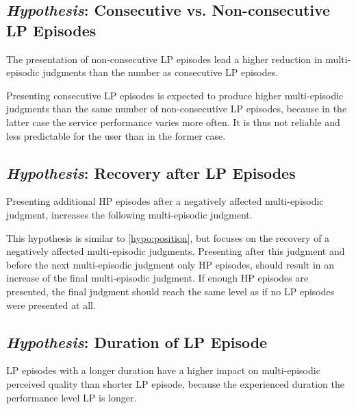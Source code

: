 \subsection{\emph{Hypothesis}: Consecutive vs. Non-consecutive \acs{LP} Episodes}
\begin{hypothesis}\label{hypo:consecutive}
The presentation of non-consecutive \ac{LP} episodes lead a higher reduction in multi-episodic judgments than the number as consecutive \ac{LP} episodes.
\end{hypothesis}

Presenting consecutive \ac{LP} episodes is expected to produce higher multi-episodic judgments than the same number of non-consecutive \ac{LP} episodes, because in the latter case the service performance varies more often.
It is thus not reliable and less predictable for the user than in the former case.

\subsection{\emph{Hypothesis}: Recovery after \acs{LP} Episodes}
\begin{hypothesis}\label{hypo:recovery}
Presenting additional \ac{HP} episodes after a negatively affected multi-episodic judgment, increases the following multi-episodic judgment.
\end{hypothesis}

This hypothesis is similar to \autoref{hypo:position}, but focuses on the recovery of a negatively affected multi-episodic judgments.
Presenting after this judgment and before the next multi-episodic judgment only \ac{HP} episodes, should result in an increase of the final multi-episodic judgment.
If enough \ac{HP} episodes are presented, the final judgment should reach the same level as if no \ac{LP} episodes were presented at all.

\subsection{\emph{Hypothesis}: Duration of \acs{LP} Episode}
\begin{hypothesis}\label{hypo:duration}
\ac{LP} episodes with a longer duration have a higher impact on multi-episodic perceived quality than shorter \ac{LP} episode, because the experienced duration the performance level \ac{LP} is longer.
\end{hypothesis}


